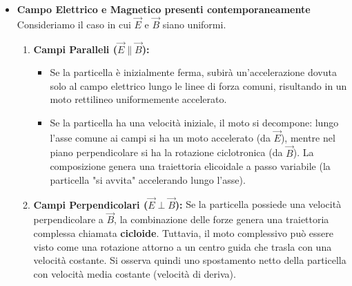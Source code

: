 \documentclass{book}
\begin{document}
\begin{itemize}
\begin{enumerate}
        \item \textbf{$\vec{v}$ con componenti parallela e perpendicolare:} Il moto è la sovrapposizione dei due casi precedenti: una rotazione uniforme nel piano perpendicolare a $\vec{B}$ e una traslazione uniforme lungo la direzione di $\vec{B}$.
        La traiettoria risultante è \textbf{elicoidale} (a forma di elica). Il "passo" $p$ dell'elica (distanza percorsa in un periodo $T$) è dato da:
        $$
        p = v_{\parallel} T = v_{\parallel} \frac{2\pi}{\omega} = v_{\parallel}\frac{2\pi m}{qB}
        $$
    \end{enumerate}

    \item \textbf{Campo Elettrico e Magnetico presenti contemporaneamente} \\
    Consideriamo il caso in cui $\vec{E}$ e $\vec{B}$ siano uniformi.

    \begin{enumerate}
        \item \textbf{Campi Paralleli ($\vec{E} \parallel \vec{B}$):}
        \begin{itemize}
            \item Se la particella è inizialmente ferma, subirà un'accelerazione dovuta solo al campo elettrico lungo le linee di forza comuni, risultando in un moto rettilineo uniformemente accelerato.
            \item Se la particella ha una velocità iniziale, il moto si decompone: lungo l'asse comune ai campi si ha un moto accelerato (da $\vec{E}$), mentre nel piano perpendicolare si ha la rotazione ciclotronica (da $\vec{B}$). La composizione genera una traiettoria elicoidale a passo variabile (la particella "si avvita" accelerando lungo l'asse).
        \end{itemize}

        \item \textbf{Campi Perpendicolari ($\vec{E} \perp \vec{B}$):}
        Se la particella possiede una velocità perpendicolare a $\vec{B}$, la combinazione delle forze genera una traiettoria complessa chiamata \textbf{cicloide}.
        Tuttavia, il moto complessivo può essere visto come una rotazione attorno a un centro guida che trasla con una velocità costante. Si osserva quindi uno spostamento netto della particella con velocità media costante (velocità di deriva).
    \end{enumerate}

\end{itemize}
\end{document}
